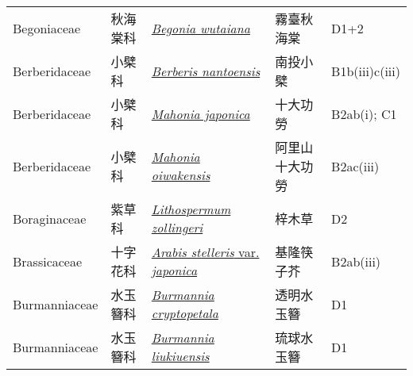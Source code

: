 {\begin{longtable}{L{2.5cm}L{2cm}L{5cm}L{2.5cm}L{3cm}}
    Begoniaceae & 秋海棠科 & \href{http://www.theplantlist.org/tpl1.1/search?q=Begonia+wutaiana}{\textit{Begonia wutaiana} } & 霧臺秋海棠 & D1+2    \\
    Berberidaceae & 小檗科 & \href{http://www.theplantlist.org/tpl1.1/search?q=Berberis+nantoensis}{\textit{Berberis nantoensis} } & 南投小檗 & B1b(iii)c(iii)    \\
    Berberidaceae & 小檗科 & \href{http://www.theplantlist.org/tpl1.1/search?q=Mahonia+japonica}{\textit{Mahonia japonica} } & 十大功勞 & B2ab(i); C1    \\
    Berberidaceae & 小檗科 & \href{http://www.theplantlist.org/tpl1.1/search?q=Mahonia+oiwakensis}{\textit{Mahonia oiwakensis} } & 阿里山十大功勞 & B2ac(iii)    \\
    Boraginaceae & 紫草科 & \href{http://www.theplantlist.org/tpl1.1/search?q=Lithospermum+zollingeri}{\textit{Lithospermum zollingeri} } & 梓木草 & D2    \\
    Brassicaceae & 十字花科 & \href{http://www.theplantlist.org/tpl1.1/search?q=Arabis+stelleris+var.+japonica}{\textit{Arabis stelleris} var. \textit{japonica} } & 基隆筷子芥 & B2ab(iii)    \\
    Burmanniaceae & 水玉簪科 & \href{http://www.theplantlist.org/tpl1.1/search?q=Burmannia+cryptopetala}{\textit{Burmannia cryptopetala} } & 透明水玉簪 & D1    \\
    Burmanniaceae & 水玉簪科 & \href{http://www.theplantlist.org/tpl1.1/search?q=Burmannia+liukiuensis}{\textit{Burmannia liukiuensis} } & 琉球水玉簪 & D1    \\

\end{longtable}}
